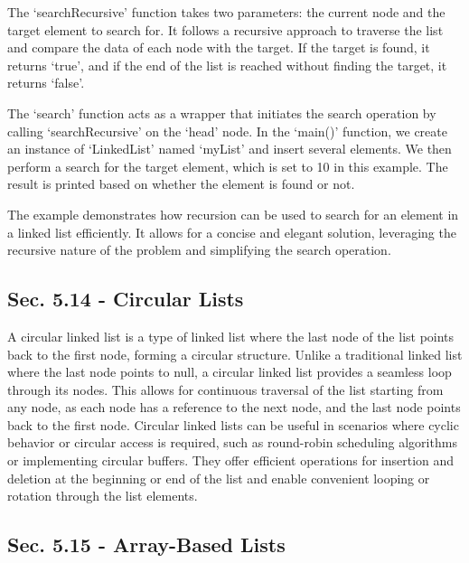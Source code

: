 \begin{solution}
    \horizontalline

    The `searchRecursive' function takes two parameters: the current node and the target element to search for. It follows a recursive approach to traverse the list and compare the data of each node with the target. If the target is found, it returns `true', and if the end of the list is reached without finding the target, it returns `false'.

    The `search' function acts as a wrapper that initiates the search operation by calling `searchRecursive' on the `head' node. In the `main()' function, we create an instance of `LinkedList' named `myList' and insert several elements. We then perform a search for the target element, which is set to 10 in this example. The result is printed based on whether the 
    element is found or not.

    The example demonstrates how recursion can be used to search for an element in a linked list efficiently. It allows for a concise and elegant solution, leveraging the recursive nature of the problem and simplifying the search operation.
\end{solution}

\subsection*{Sec. 5.14 - Circular Lists}

A circular linked list is a type of linked list where the last node of the list points back to the first node, forming a circular structure. Unlike a traditional linked list where the last node points to null, a circular linked list provides a seamless loop through its nodes. This allows for continuous traversal of the list starting from any node, 
as each node has a reference to the next node, and the last node points back to the first node. Circular linked lists can be useful in scenarios where cyclic behavior or circular access is required, such as round-robin scheduling algorithms or implementing circular buffers. They offer efficient operations for insertion and deletion at the beginning 
or end of the list and enable convenient looping or rotation through the list elements.

\subsection*{Sec. 5.15 - Array-Based Lists}

